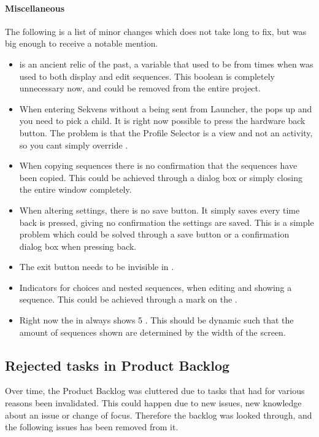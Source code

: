 \paragraph{Miscellaneous}
The following is a list of minor changes which does not take long to fix, but was big enough to receive a notable mention. 

\begin{itemize}
\item {} is an ancient relic of the past, a variable that used to be from times when  was used to both display and edit sequences. This boolean is completely unnecessary now, and could be removed from the entire project.
\item When entering Sekvens without a  being sent from Launcher, the  pops up and you need to pick a child. It is right now possible to press the hardware back button. The problem is that the Profile Selector is a view and not an activity, so you cant simply override .
\item When copying sequences there is no confirmation that the sequences have been copied. This could be achieved through a dialog box or simply closing the entire window completely.
\item When altering settings, there is no save button. It simply saves every time back is pressed, giving no confirmation the settings are saved. This is a simple problem which could be solved through a save button or a confirmation dialog box when pressing back.
\item The exit button needs to be invisible in . 
\item Indicators for choices and nested sequences, when editing and showing a sequence. This could be achieved through a mark on the .
\item Right now the  in  always shows 5 . This should be dynamic such that the amount of sequences shown are determined by the width of the screen.
\end{itemize}

\subsection{Rejected tasks in Product Backlog}
Over time, the Product Backlog was cluttered due to tasks that had for various reasons been invalidated. This could happen due to new issues, new knowledge about an issue or change of focus. Therefore the backlog was looked through, and the following issues has been removed from it.

